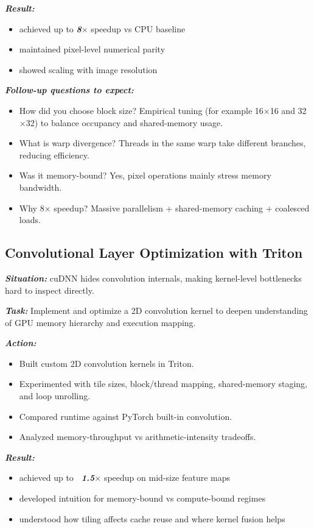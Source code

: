 \documentclass[12pt]{article}
\let\origtextbf\textbf
\renewcommand{\textbf}[1]{\origtextbf{\textit{#1}}}
\begin{document}
\textbf{Result:}
\begin{itemize}
\item achieved up to \textbf{8\(\times\)} speedup vs CPU baseline
\item maintained pixel-level numerical parity
\item showed scaling with image resolution
\end{itemize}

\textbf{Follow-up questions to expect:}
\begin{itemize}
\item How did you choose block size? Empirical tuning (for example 16\(\times\)16 and 32\(\times\)32) to balance occupancy and shared-memory usage.
\item What is warp divergence? Threads in the same warp take different branches, reducing efficiency.
\item Was it memory-bound? Yes, pixel operations mainly stress memory bandwidth.
\item Why 8\(\times\) speedup? Massive parallelism + shared-memory caching + coalesced loads.
\end{itemize}

\subsection{Convolutional Layer Optimization with Triton}
\textbf{Situation:}
cuDNN hides convolution internals, making kernel-level bottlenecks hard to inspect directly.

\textbf{Task:}
Implement and optimize a 2D convolution kernel to deepen understanding of GPU memory hierarchy and execution mapping.

\textbf{Action:}
\begin{itemize}
\item Built custom 2D convolution kernels in Triton.
\item Experimented with tile sizes, block/thread mapping, shared-memory staging, and loop unrolling.
\item Compared runtime against PyTorch built-in convolution.
\item Analyzed memory-throughput vs arithmetic-intensity tradeoffs.
\end{itemize}

\textbf{Result:}
\begin{itemize}
\item achieved up to \textbf{~1.5\(\times\)} speedup on mid-size feature maps
\item developed intuition for memory-bound vs compute-bound regimes
\item understood how tiling affects cache reuse and where kernel fusion helps
\end{itemize}
\end{document}
